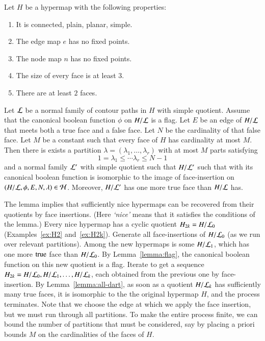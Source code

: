 \begin{theorem}  Let $H$ be a hypermap with the following properties:
    \begin{enumerate}
        \item It is connected, plain, planar, simple.
        \item The edge map $e$ has no fixed points.
        \item The node map $n$ has no fixed points.
        \item The size of every face is at least $3$.
        \item There are at least $2$ faces. 
    \end{enumerate}
Let $\cal L$ be a normal family of contour paths in $H$ with
simple quotient. Assume that
the canonical boolean function $\phi$ on $H/{\cal L}$ is a flag. Let
$E$ be an edge of $H/{\cal L}$ that meets both a true face
and a false face. Let $N$ be the cardinality of that false face. Let
$M$ be a constant such that every face of $H$ has cardinality at
most $M$. Then there is exists a partition $\lambda=(\lambda_1,\ldots,\lambda_r)$ with at most
$M$ parts satisfying $$1=\lambda_1\le \cdots\lambda_r \le N-1$$
and a normal family
${\cal L}'$ with simple quotient such that $H/{\cal L}'$  such that
with its canonical boolean
function is isomorphic to the image of face-insertion on
$(H/{\cal L},\phi,E,N,\lambda)\in {\cal H}$. 
Moreover, $H/{\cal L}'$
has one more true face than $H/{\cal L}$ has.
\end{theorem}

\begin{remark}
\label{remark:nice-algorithm} 
The lemma implies that sufficiently nice hypermaps can be recovered
from their quotients by face insertions.  (Here {\it `nice'} means
that it satisfies the conditions of the lemma.)  
Every nice hypermap has a cyclic quotient 
$H_{2k}=H/{\cal L}_0$
(Examples~\ref{ex:H2} and~\ref{ex:H2k}).
Generate all face-insertions of $H/{\cal L}_0$ 
(as we run over relevant partitions).
Among the new hypermaps is some $H/{\cal L}_1$, which
has one more ${\operatorname{true}}$ face than $H/{\cal L}_0$.  By 
Lemma~\ref{lemma:flag}, 
the canonical boolean function on this new quotient
is a flag.  Iterate to get a sequence
$H_{2k} = H/{\cal L}_0, H/{\cal L}_1,\ldots, H/{\cal L}_k$,
each obtained from the previous one by face-insertion.
By Lemma~\ref{lemma:all-dart}, 
as
soon as a quotient $H/{\cal L}_k$ 
has sufficiently many true faces, it is
isomorphic to the the original hypermap $H$, and the process
terminates.
Note that we choose the edge at which we apply the face
insertion, but we must run through
all partitions.  To make the entire process finite, we can bound the
number of partitions that must be considered, say by placing a
priori bounds $M$ on the cardinalities of the faces of $H$.
\end{remark}

